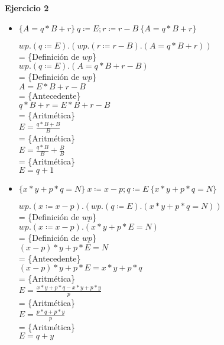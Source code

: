 \documentclass[12pt]{article}
\begin{document}
\begin{itemize}
\end{itemize}

\textbf{Ejercicio 2}

\begin{itemize}
    \item $\{A = q * B + r\} ~ q \coloneqq E; r \coloneqq r - B ~ \{A = q * B + r\}$

    \bigbreak

    $wp.(q \coloneqq E).(wp.(r \coloneqq r - B).(A = q * B + r))$\\
    = \{Definición de $wp$\}\\
    $wp.(q \coloneqq E).(A = q * B + r - B)$\\
    = \{Definición de $wp$\}\\
    $A = E * B + r - B$\\
    = \{Antecedente\}\\
    $q * B + r = E * B + r - B$\\
    = \{Aritmética\}\\
    $E = \frac{q * B + B}{B}$\\
    = \{Aritmética\}\\
    $E = \frac{q * B}{B} + \frac{B}{B}$\\
    = \{Aritmética\}\\
    $E = q + 1$

    \item $\{x * y + p * q = N\} ~ x \coloneqq x - p; q \coloneqq E ~ \{x * y + p * q = N\}$

    \bigbreak

    $wp.(x \coloneqq x - p).(wp.(q \coloneqq E).(x * y + p * q = N))$\\
    = \{Definición de $wp$\}\\
    $wp.(x \coloneqq x - p).(x * y + p * E = N)$\\
    = \{Definición de $wp$\}\\
    $(x - p) * y + p * E = N$\\
    = \{Antecedente\}\\
    $(x - p) * y + p * E = x * y + p * q$\\
    = \{Aritmética\}\\
    $E = \frac{x * y + p * q - x * y + p * y}{p}$\\
    = \{Aritmética\}\\
    $E = \frac{p * q + p * y}{p}$\\
    = \{Aritmética\}\\
    $E = q + y$

    \bigbreak


\end{itemize}
\end{document}
